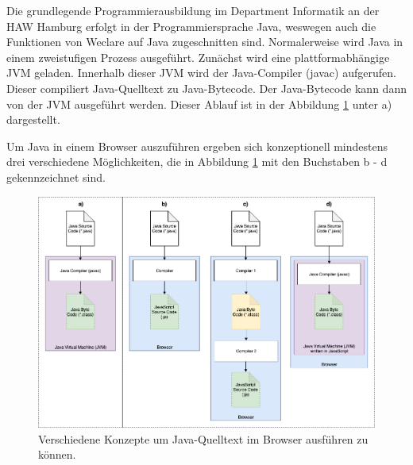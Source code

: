 Die grundlegende Programmierausbildung im Department Informatik an der HAW Hamburg erfolgt in der Programmiersprache Java, weswegen auch die Funktionen von Weclare auf Java zugeschnitten sind. Normalerweise wird Java in einem zweistufigen Prozess ausgeführt. Zunächst wird eine plattformabhängige JVM geladen. Innerhalb dieser JVM wird der Java-Compiler (javac) aufgerufen. Dieser compiliert Java-Quelltext zu Java-Bytecode. Der Java-Bytecode kann dann von der JVM ausgeführt werden. Dieser Ablauf ist in der Abbildung \ref{abb:java_execution} unter a) dargestellt.

Um Java in einem Browser auszuführen ergeben sich konzeptionell mindestens drei verschiedene Möglichkeiten, die in Abbildung \ref{abb:java_execution} mit den Buchstaben b - d gekennzeichnet sind.

\begin{figure}[H]
    \includegraphics[width=14cm]{chapter/entwurf/bilder/Java_JavaScript_Execution.png}
    \centering
    \caption{Verschiedene Konzepte um Java-Quelltext im Browser ausführen zu können.}
    \label{abb:java_execution}
\end{figure}

\newpage

